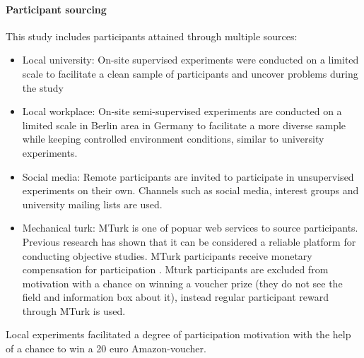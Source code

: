\paragraph{Participant sourcing} 
This study includes participants attained through multiple sources:
\begin{itemize}
	\item{Local university:} On-site supervised experiments were conducted on a limited scale to facilitate a clean sample of participants and uncover problems during the study
	
	\item{Local workplace:} On-site semi-supervised experiments are conducted on a limited scale in Berlin area in Germany to facilitate a more diverse sample while keeping controlled environment conditions, similar to university experiments.
	
	\item{Social media:} Remote participants are invited to participate in unsupervised experiments on their own. Channels such as social media, interest groups and university mailing lists are used.
	
	\item{Mechanical turk:} MTurk is one of popuar web services to source participants. Previous research has shown that it can be considered a reliable platform for conducting objective studies. MTurk participants receive monetary compensation for participation \cite{Buhrmester2011a}. Mturk participants are excluded from motivation with a chance on winning a voucher prize (they do not see the field and information box about it), instead regular participant reward through MTurk is used.
	
\end{itemize}

Local experiments facilitated a degree of participation motivation with the help of a chance to win a 20 euro Amazon-voucher.